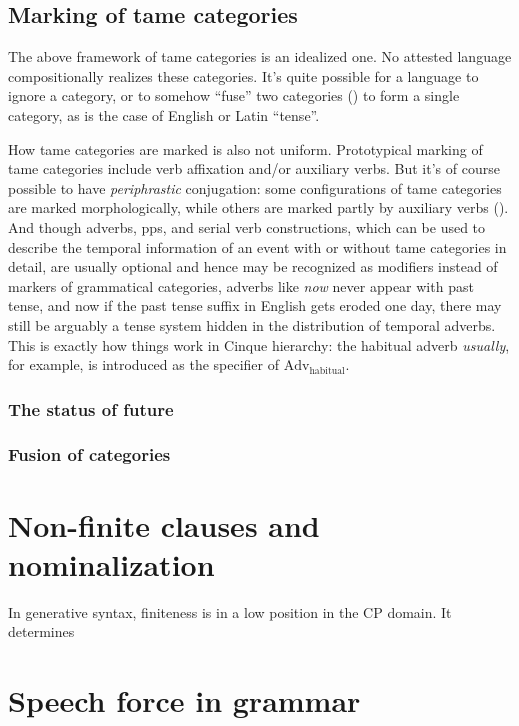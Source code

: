 \documentclass[UTF8, a4paper, oneside, scheme=plain]{ctexart}
\newcommand*{\corpus}[1]{\emph{#1}}
\begin{document}
\subsection{Marking of \ac{tame} categories}

The above framework of \ac{tame} categories is an idealized one.
No attested language compositionally realizes these categories.
It's quite possible for a language to ignore a category,
or to somehow ``fuse'' two categories ()
to form a single category,
as is the case of English or Latin ``tense''.

How \ac{tame} categories are marked is also not uniform.
Prototypical marking of \ac{tame} categories include 
verb affixation and/or auxiliary verbs.
But it's of course possible to have \emph{periphrastic} conjugation:
some configurations of \ac{tame} categories are marked morphologically,
while others are marked partly by auxiliary verbs ().
And though adverbs, \acs{pp}s, and serial verb constructions,
which can be used to describe the temporal information of an event 
with or without \ac{tame} categories in detail,
are usually optional 
and hence may be recognized as modifiers instead of markers of grammatical categories,
adverbs like \corpus{now} never appear with past tense,
and now if the past tense suffix in English gets eroded one day,
there may still be arguably a tense system
hidden in the distribution of temporal adverbs.
This is exactly how things work in Cinque hierarchy:
the habitual adverb \corpus{usually}, for example,
is introduced as the specifier of $\text{Adv}_{\text{habitual}}$.

\subsubsection{The status of future}

\subsubsection{Fusion of categories}\label{sec:fusion-of-tame}

\section{Non-finite clauses and nominalization}

In generative syntax, finiteness is in a low position in the CP domain.
It determines 

\section{Speech force in grammar}
\end{document}
